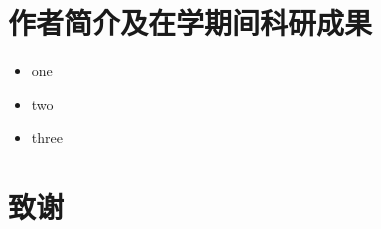 \documentclass[twoside,a4paper,12pt]{article}
\begin{document}
\begin{CJK}{UTF8}{gbsn}
\newpage
\renewcommand\refname{\center{\textbf{参考文献}}}









\newpage
{\centering\section*{作者简介及在学期间科研成果}}


\begin{itemize}
  \item  one 
    \item  two
    \item  three
\end{itemize}

\newpage
{\centering\section*{致谢}}


\end{CJK}
\end{document}

